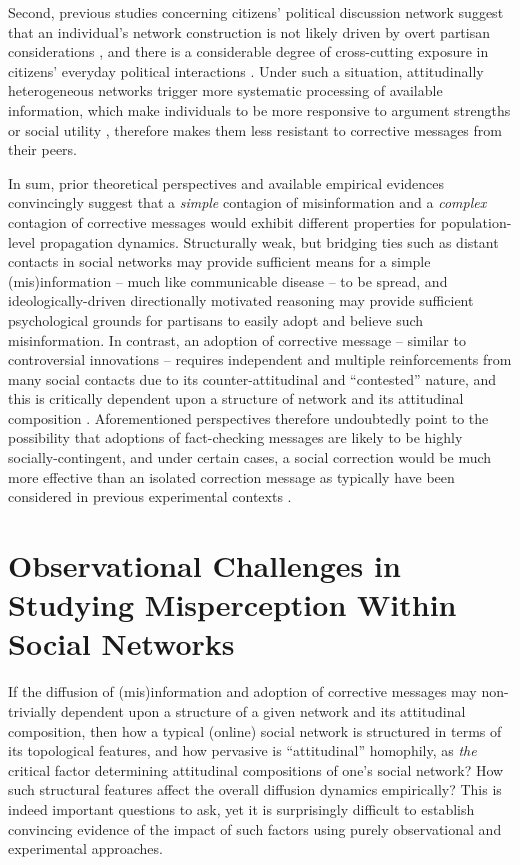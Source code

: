 \documentclass[man, 12pt, a4paper, nolmodern, noextraspace]{apa6}
\begin{document}
    Second, previous studies concerning citizens' political discussion network suggest that an individual's network construction is not likely driven by overt partisan considerations \parencite{song2015uncovering,lazer2010coevolution}, and there is a considerable degree of cross-cutting exposure in citizens' everyday political interactions \parencite[e.g.,][]{Bakshy1130, morey2012matters, huckfeldt2004disagreement}. Under such a situation, attitudinally heterogeneous networks trigger more systematic processing of available information, which make individuals to be more responsive to argument strengths \parencite{levitan2008resistance} or social utility \parencite{messing2014selective}, therefore makes them less resistant to corrective messages from their peers.    

 In sum, prior theoretical perspectives and available empirical evidences convincingly suggest that a \emph{simple} contagion of misinformation and a \emph{complex} contagion of corrective messages would exhibit different properties for population-level propagation dynamics. Structurally weak, but bridging ties such as distant contacts in social networks may provide sufficient means for a simple (mis)information -- much like communicable disease -- to be spread, and ideologically-driven directionally motivated reasoning may provide sufficient psychological grounds for partisans to easily adopt and believe such misinformation. In contrast, an adoption of corrective message -- similar to controversial innovations -- requires independent and multiple reinforcements from many social contacts due to its counter-attitudinal and \enquote{contested} nature, and this is critically dependent upon a structure of network and its attitudinal composition \parencite{centola2007complex, Centola2010Sience, gonzalez2017decoding}. Aforementioned perspectives therefore undoubtedly point to the possibility that adoptions of fact-checking messages are likely to be highly socially-contingent, and under certain cases, a social correction would be much more effective than an isolated correction message as typically have been considered in previous experimental contexts \parencite[e.g.,][]{nyhan2010corrections,garrett2013undermining}.
    
\section{Observational Challenges in Studying Misperception Within Social Networks}

  If the diffusion of (mis)information and adoption of corrective messages may non-trivially dependent upon a structure of a given network and its attitudinal composition, then how a typical (online) social network is structured in terms of its topological features, and how pervasive is \enquote{attitudinal} homophily, as \emph{the} critical factor determining attitudinal compositions of one's social network? How such structural features affect the overall diffusion dynamics empirically? This is indeed important questions to ask, yet it is surprisingly difficult to establish convincing evidence of the impact of such factors using purely observational and experimental approaches.
    
\end{document}
